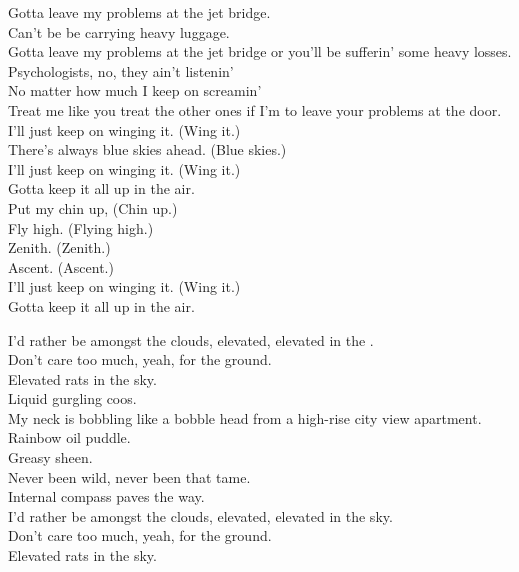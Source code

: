 Gotta leave my problems at the jet bridge. \\
Can't be be carrying heavy luggage. \\
Gotta leave my problems at the jet bridge or you'll be sufferin' some heavy losses. \\
Psychologists, no, they ain't listenin' \\
No matter how much I keep on screamin' \\
Treat me like you treat the other ones if I'm to leave your problems at the door. \\

I'll just keep on winging it. (Wing it.) \\
There's always blue skies ahead. (Blue skies.) \\
I'll just keep on winging it. (Wing it.) \\
Gotta keep it all up in the air. \\
Put my chin up, (Chin up.) \\
Fly high. (Flying high.) \\
Zenith. (Zenith.) \\
Ascent. (Ascent.) \\
I'll just keep on winging it. (Wing it.) \\
Gotta keep it all up in the air. \\



I'd rather be amongst the clouds, elevated, elevated in the . \\
Don't care too much, yeah, for the ground. \\
Elevated rats in the sky. \\
Liquid gurgling coos. \\
My neck is bobbling like a bobble head from a high-rise city view apartment. \\
Rainbow oil puddle. \\
Greasy sheen. \\
Never been wild, never been that tame. \\
Internal compass paves the way. \\
I'd rather be amongst the clouds, elevated, elevated in the sky. \\
Don't care too much, yeah, for the ground. \\
Elevated rats in the sky. \\

